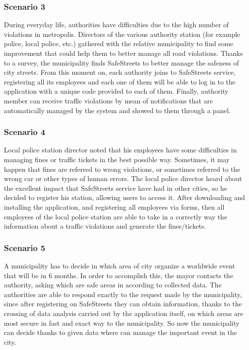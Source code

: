 \documentclass[12pt]{article}
\begin{document}
\subsubsection{Scenario 3}
\vspace{2mm}

During everyday life, authorities have difficulties due to the high number of violations in metropolis. Directors of the various authority station (for example police, local police, etc.) gathered with the relative municipality to find some improvement that could help them to better manage all road violations. Thanks to a survey, the municipality finds SafeStreets to better manage the safeness of city streets. From this moment on, each authority joins to SafeStreets service, registering all its employees and each one of them will be able to log in to the application with a unique code provided to each of them. Finally, authority member can receive traffic violations by mean of notifications that are automatically managed by the system and showed to them through a panel.


\subsubsection{Scenario 4}
\vspace{2mm}
Local police station director noted that his employees have some difficulties in managing fines or traffic tickets in the best possible way. Sometimes, it may happen that fines are referred to wrong violations, or sometimes referred to the wrong car or other types of human errors. The local police director heard about the excellent impact that SafeStreets service have had in other cities, so he  decided to register his station, allowing users to access it. After downloading and installing the application, and registering all employees via forms, then all employees of the local police station are able to take in a correctly way the information about a traffic violations and generate the fines/tickets. 

\subsubsection{Scenario 5}
\vspace{2mm}
A municipality has to decide in which area of city organize a worldwide event that will be in 6 months. In order to accomplish this, the mayor contacts the authority, asking which are safe areas in according to collected data. The authorities are able to respond exactly to the request made by the municipality, since after registering on SafeStreets they can obtain information, thanks to the crossing of data analysis carried out by the application itself, on which areas are most secure in fast and exact way to the municipality. So now the municipality can decide thanks to given data where can manage the important event in the city.
\end{document}
